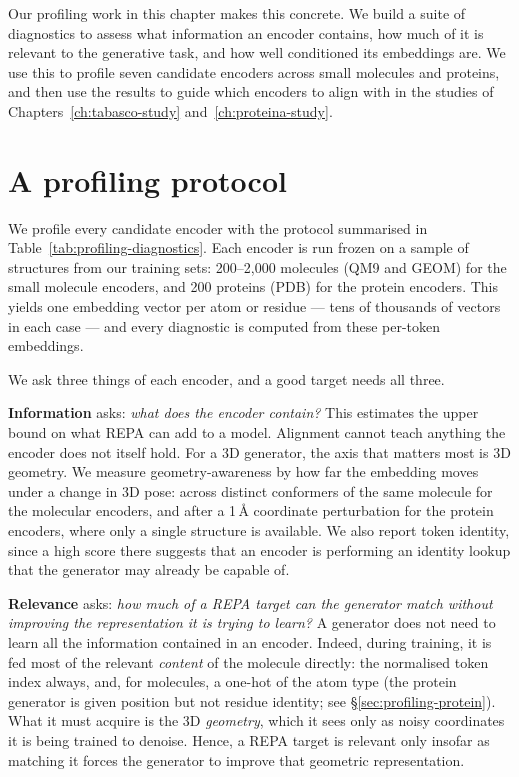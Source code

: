 \documentclass[12pt,a4paper,twoside]{report}
\begin{document}
Our profiling work in this chapter makes this concrete. We build a suite of diagnostics to assess what information an encoder contains, how much of it is relevant to the generative task, and how well conditioned its embeddings are. We use this to profile seven candidate encoders across small molecules and proteins, and then use the results to guide which encoders to align with in the studies of Chapters~\ref{ch:tabasco-study} and~\ref{ch:proteina-study}.

\section{A profiling protocol}
\label{sec:profiling-framework}

We profile every candidate encoder with the protocol summarised in Table~\ref{tab:profiling-diagnostics}. Each encoder is run frozen on a sample of structures from our training sets: 200--2{,}000 molecules (QM9 and GEOM) for the small molecule encoders, and 200 proteins (PDB) for the protein encoders. This yields one embedding vector per atom or residue --- tens of thousands of vectors in each case --- and every diagnostic is computed from these per-token embeddings.



We ask three things of each encoder, and a good target needs all three.

\textbf{Information} asks: \emph{what does the encoder contain?} This estimates the upper bound on what REPA can add to a model. Alignment cannot teach anything the encoder does not itself hold. For a 3D generator, the axis that matters most is 3D geometry. We measure geometry-awareness by how far the embedding moves under a change in 3D pose: across distinct conformers of the same molecule for the molecular encoders, and after a 1\,\AA{} coordinate perturbation for the protein encoders, where only a single structure is available. We also report token identity, since a high score there suggests that an encoder is performing an identity lookup that the generator may already be capable of.

\textbf{Relevance} asks: \emph{how much of a REPA target can the generator match without improving the representation it is trying to learn?} A generator does not need to learn all the information contained in an encoder. Indeed, during training, it is fed most of the relevant \emph{content} of the molecule directly: the normalised token index always, and, for molecules, a one-hot of the atom type (the protein generator is given position but not residue identity; see \S\ref{sec:profiling-protein}). What it must acquire is the 3D \emph{geometry}, which it sees only as noisy coordinates it is being trained to denoise. Hence, a REPA target is relevant only insofar as matching it forces the generator to improve that geometric representation.
\end{document}
